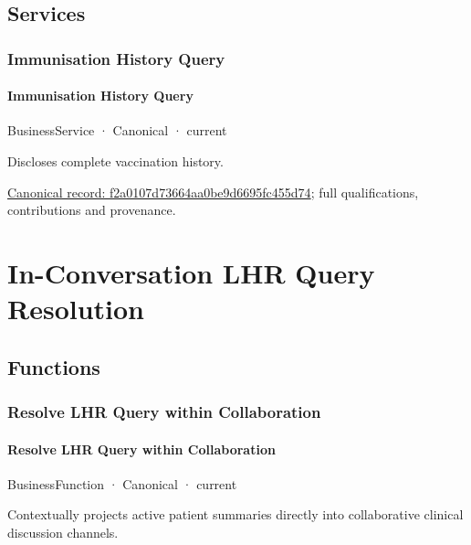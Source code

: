 \subsection{Services}

\subsubsection{Immunisation History Query}

\paragraph{Immunisation History Query}

\label{element:f2a0107d73664aa0be9d6695fc455d74}
{\small BusinessService · Canonical · current}\par

Discloses complete vaccination history.


{\footnotesize \href{../../../../continuum/business/business-service/f2a0107d73664aa0be9d6695fc455d74.md}{Canonical record: f2a0107d73664aa0be9d6695fc455d74}; full qualifications, contributions and provenance.}\par
\section{In-Conversation LHR Query Resolution}

\subsection{Functions}

\subsubsection{Resolve LHR Query within Collaboration}

\paragraph{Resolve LHR Query within Collaboration}

\label{element:1d4ac561d963484480e6b06a09416616}
{\small BusinessFunction · Canonical · current}\par

Contextually projects active patient summaries directly into collaborative clinical discussion channels.


